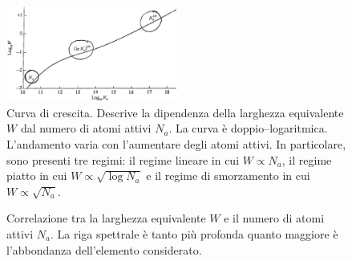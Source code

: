\begin{figure}
    \centering
    \includegraphics[width=0.5\textwidth]{immagini/curva-crescita.png}
    \caption{Curva di crescita. Descrive la dipendenza della larghezza equivalente $W$ dal numero di atomi attivi $N_a$. La curva è doppio--logaritmica. L'andamento varia con l'aumentare degli atomi attivi. In particolare, sono presenti tre regimi: il regime lineare in cui $W \propto N_a$, il regime piatto in cui $W \propto \sqrt{\log N_a}$ e il regime di smorzamento in cui $W \propto \sqrt{N_a}$.} 
    \label{fig:curva-crescita}
\end{figure}

\begin{figure}
\centering
{} \quad
{} \quad
{}
\caption{Correlazione tra la larghezza equivalente $W$ e il numero di atomi attivi $N_a$. La riga spettrale è tanto più profonda quanto maggiore è l’abbondanza dell’elemento considerato.}
\label{fig:larghezza-equivalente}
\end{figure}

